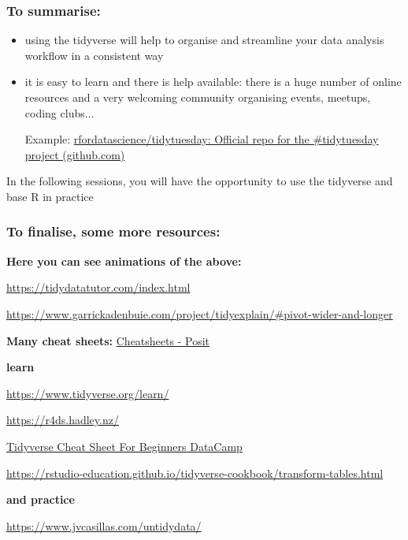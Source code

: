 \documentclass[
]{article}
\begin{document}
\hypertarget{to-summarise}{%
\subsubsection{\texorpdfstring{\textbf{To
summarise}:}{To summarise:}}\label{to-summarise}}

\begin{itemize}
\item
  using the tidyverse will help to organise and streamline your data
  analysis workflow in a consistent way
\item
  it is easy to learn and there is help available: there is a huge
  number of online resources and a very welcoming community organising
  events, meetups, coding clubs...

  Example:
  \href{https://github.com/rfordatascience/tidytuesday/tree/master}{rfordatascience/tidytuesday:
  Official repo for the \#tidytuesday project (github.com)}
\end{itemize}

In the following sessions, you will have the opportunity to use the
tidyverse and base R in practice

\hypertarget{to-finalise-some-more-resources}{%
\subsubsection{To finalise, some more
resources:}\label{to-finalise-some-more-resources}}

\textbf{Here you can see animations of the above:}

\url{https://tidydatatutor.com/index.html}

\url{https://www.garrickadenbuie.com/project/tidyexplain/\#pivot-wider-and-longer}

\textbf{Many cheat sheets:}
\href{https://posit.co/resources/cheatsheets/}{Cheatsheets - Posit}

\textbf{learn}

\url{https://www.tidyverse.org/learn/}

\url{https://r4ds.hadley.nz/}

\href{https://www.datacamp.com/cheat-sheet/tidyverse-cheat-sheet-for-beginners}{Tidyverse
Cheat Sheet For Beginners \textbar{} DataCamp}

\url{https://rstudio-education.github.io/tidyverse-cookbook/transform-tables.html}

\textbf{and practice}

\url{https://www.jvcasillas.com/untidydata/}
\end{document}
